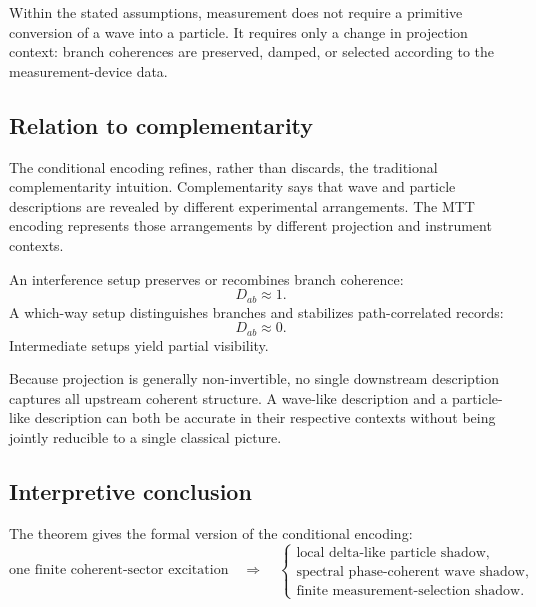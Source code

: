 \documentclass[11pt]{article}
\begin{document}
\begin{remark}
\label{cor:no-primitive-conversion}
Within the stated assumptions, measurement does not require a primitive conversion of a
wave into a particle. It requires only a change in projection context: branch coherences are
preserved, damped, or selected according to the measurement-device data.
\end{remark}

\subsection{Relation to complementarity}
\label{subsec:relation-complementarity}

The conditional encoding refines, rather than discards, the traditional complementarity
intuition. Complementarity says that wave and particle descriptions are revealed by different
experimental arrangements. The MTT encoding represents those arrangements by different
projection and instrument contexts.

An interference setup preserves or recombines branch coherence:
\begin{equation}
  D_{ab}\approx1.
\end{equation}
A which-way setup distinguishes branches and stabilizes path-correlated records:
\begin{equation}
  D_{ab}\approx0.
\end{equation}
Intermediate setups yield partial visibility.

Because projection is generally non-invertible, no single downstream description captures all
upstream coherent structure. A wave-like description and a particle-like description can both
be accurate in their respective contexts without being jointly reducible to a single classical
picture.

\subsection{Interpretive conclusion}
\label{subsec:projection-duality-interpretive-conclusion}

The theorem gives the formal version of the conditional encoding:
\begin{equation}
  \boxed{
  \text{one finite coherent-sector excitation}
  \quad\Longrightarrow\quad
  \begin{cases}
    \text{local delta-like particle shadow},\\
    \text{spectral phase-coherent wave shadow},\\
    \text{finite measurement-selection shadow}.
  \end{cases}
  }
\end{equation}
\end{document}
